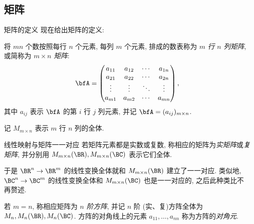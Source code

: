 \subsection{矩阵}
\begin{frame}{矩阵的定义}
	\onslide<+->
	现在给出矩阵的定义:
	\onslide<+->
	\begin{definition}
		将 $mn$ 个数按照每行 $n$ 个元素, 每列 $m$ 个元素, 排成的数表称为 \emph{$m$ 行 $n$ 列矩阵}, 或简称为 \emph{$m\times n$ 矩阵}:
		\[\bfA=\begin{pmatrix}
			a_{11}&a_{12}&\cdots &a_{1n}\\
			a_{21}&a_{22}&\cdots &a_{2n}\\
			\vdots&\vdots&\ddots&\vdots\\
			a_{m1}&a_{m2}&\cdots &a_{mn}
		\end{pmatrix},\]
		其中 $a_{ij}$ 表示 $\bfA$ 的第 $i$ 行 $j$ 列元素, 并记 $\bfA=(a_{ij})_{m\times n}$.
	\end{definition}
	\onslide<+->
	记 $M_{m\times n}$ 表示 $m$ 行 $n$ 列的全体.
\end{frame}


\begin{frame}{线性映射与矩阵一一对应\noexer}
	\onslide<+->
	若矩阵元素都是实数或复数, 称相应的矩阵为\emph{实矩阵}或\emph{复矩阵}, 并分别用 $M_{m\times n}(\BR),M_{m\times n}(\BC)$ 表示它们全体.

	\onslide<+->
	于是 $\BR^n\to\BR^m$ 的线性变换全体就和 $M_{m\times n}(\BR)$ 建立了一一对应.
	\onslide<+->
	类似地, $\BC^n\to\BC^m$ 的线性变换全体和 $M_{m\times n}(\BC)$ 也是一一对应的, 之后此种类比不再赘述.

	\onslide<+->
	若 $m=n$, 称相应矩阵为 \emph{$n$ 阶方阵}, 并记 $n$ 阶 (实、复)方阵全体为 $M_n,M_n(\BR),M_n(\BC)$.
	\onslide<+->
	方阵的对角线上的元素 $a_{11},\dots,a_{nn}$ 称为方阵的\emph{对角元}.
\end{frame}



